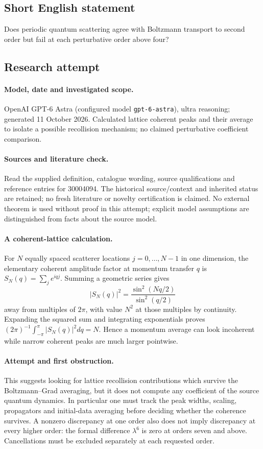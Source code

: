\documentclass[11pt]{article}
\begin{document}
\subsection{Short English statement}
Does periodic quantum scattering agree with Boltzmann transport to second order but fail at each perturbative order above four?
\subsection{Research attempt}
\paragraph{Model, date and investigated scope.}
OpenAI GPT-6 Astra (configured model \texttt{gpt-6-astra}), ultra reasoning; generated 11 October 2026. Calculated lattice coherent peaks and their average to isolate a possible recollision mechanism; no claimed perturbative coefficient comparison.

\paragraph{Sources and literature check.}
Read the supplied definition, catalogue wording, source qualifications and reference entries for 30004094. The historical source/context and inherited status are retained; no fresh literature or novelty certification is claimed. No external theorem is used without proof in this attempt; explicit model assumptions are distinguished from facts about the source model.

\paragraph{A coherent-lattice calculation.} For \(N\) equally spaced scatterer locations \(j=0,\ldots,N-1\) in one dimension, the elementary coherent amplitude factor at momentum transfer \(q\) is \(S_N(q)=\sum_j e^{iqj}\). Summing a geometric series gives
\[
 |S_N(q)|^2=\frac{\sin^2(Nq/2)}{\sin^2(q/2)}
\]
away from multiples of \(2\pi\), with value \(N^2\) at those multiples by continuity. Expanding the squared sum and integrating exponentials proves \((2\pi)^{-1}\int_{-\pi}^{\pi}|S_N(q)|^2dq=N\). Hence a momentum average can look incoherent while narrow coherent peaks are much larger pointwise.
\paragraph{Attempt and first obstruction.} This suggests looking for lattice recollision contributions which survive the Boltzmann--Grad averaging, but it does not compute any coefficient of the source quantum dynamics. In particular one must track the peak widths, scaling, propagators and initial-data averaging before deciding whether the coherence survives. A nonzero discrepancy at one order also does not imply discrepancy at every higher order: the formal difference \(\lambda^6\) is zero at orders seven and above. Cancellations must be excluded separately at each requested order.
\end{document}
